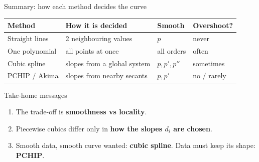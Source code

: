 \documentclass[aspectratio=169]{beamer}
\begin{document}
\begin{frame}{Summary: how each method decides the curve}
\small
\centering
\setlength{\tabcolsep}{6pt}
\renewcommand{\arraystretch}{1.4}
\begin{tabular}{llll}
\toprule
\textbf{Method} & \textbf{How it is decided} & \textbf{Smooth} & \textbf{Overshoot?} \\
\midrule
Straight lines & 2 neighbouring values & $p$ & never \\
One polynomial & all points at once & all orders & often \\
Cubic spline & slopes from a global system & $p, p', p''$ & sometimes \\
PCHIP / Akima & slopes from nearby secants & $p, p'$ & no / rarely \\
\bottomrule
\end{tabular}
\vspace{0.4cm}
\raggedright
\begin{block}{Take-home messages}
\footnotesize
\begin{enumerate}
  \setlength{\itemsep}{3pt}
  \item The trade-off is \textbf{smoothness vs locality}.
  \item Piecewise cubics differ only in \textbf{how the slopes $d_i$ are chosen}.
  \item Smooth data, smooth curve wanted: \textbf{cubic spline}. Data must keep its shape: \textbf{PCHIP}.
\end{enumerate}
\end{block}
\end{frame}
\end{document}
